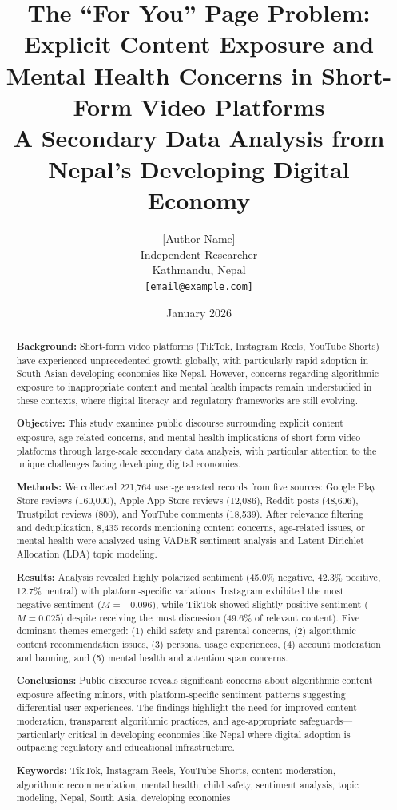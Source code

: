 \documentclass[11pt,a4paper]{article}
\title{\textbf{The ``For You'' Page Problem: Explicit Content Exposure and Mental Health Concerns in Short-Form Video Platforms}\\[0.3cm]
\large A Secondary Data Analysis from Nepal's Developing Digital Economy}
\author{
    [Author Name]\\
    Independent Researcher\\
    Kathmandu, Nepal\\
    \texttt{[email@example.com]}
}
\date{January 2026}
\begin{document}
\maketitle

\begin{abstract}
\noindent
\textbf{Background:} Short-form video platforms (TikTok, Instagram Reels, YouTube Shorts) have experienced unprecedented growth globally, with particularly rapid adoption in South Asian developing economies like Nepal. However, concerns regarding algorithmic exposure to inappropriate content and mental health impacts remain understudied in these contexts, where digital literacy and regulatory frameworks are still evolving.

\textbf{Objective:} This study examines public discourse surrounding explicit content exposure, age-related concerns, and mental health implications of short-form video platforms through large-scale secondary data analysis, with particular attention to the unique challenges facing developing digital economies.

\textbf{Methods:} We collected 221,764 user-generated records from five sources: Google Play Store reviews (160,000), Apple App Store reviews (12,086), Reddit posts (48,606), Trustpilot reviews (800), and YouTube comments (18,539). After relevance filtering and deduplication, 8,435 records mentioning content concerns, age-related issues, or mental health were analyzed using VADER sentiment analysis and Latent Dirichlet Allocation (LDA) topic modeling.

\textbf{Results:} Analysis revealed highly polarized sentiment (45.0\% negative, 42.3\% positive, 12.7\% neutral) with platform-specific variations. Instagram exhibited the most negative sentiment ($M = -0.096$), while TikTok showed slightly positive sentiment ($M = 0.025$) despite receiving the most discussion (49.6\% of relevant content). Five dominant themes emerged: (1) child safety and parental concerns, (2) algorithmic content recommendation issues, (3) personal usage experiences, (4) account moderation and banning, and (5) mental health and attention span concerns.

\textbf{Conclusions:} Public discourse reveals significant concerns about algorithmic content exposure affecting minors, with platform-specific sentiment patterns suggesting differential user experiences. The findings highlight the need for improved content moderation, transparent algorithmic practices, and age-appropriate safeguards---particularly critical in developing economies like Nepal where digital adoption is outpacing regulatory and educational infrastructure.

\vspace{0.3cm}
\noindent\textbf{Keywords:} TikTok, Instagram Reels, YouTube Shorts, content moderation, algorithmic recommendation, mental health, child safety, sentiment analysis, topic modeling, Nepal, South Asia, developing economies
\end{abstract}
\end{document}

